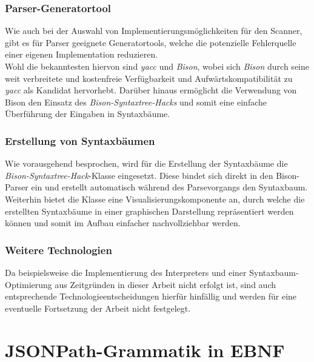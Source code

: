 \documentclass[oneside]{ausarbeitung}
\begin{document}
\pagebreak


\subsubsection{Parser-Generatortool}

Wie auch bei der Auswahl von Implementierungsmöglichkeiten für den Scanner, gibt es für Parser geeignete Generatortools, welche die potenzielle Fehlerquelle einer eigenen Implementation reduzieren. \\
Wohl die bekanntesten hiervon sind \textit{yacc} und \textit{Bison}, wobei sich \textit{Bison} durch seine weit verbreitete und kostenfreie Verfügbarkeit und Aufwärtskompatibilität zu \textit{yacc} als Kandidat hervorhebt. Darüber hinaus ermöglicht die Verwendung von Bison den Einsatz des \textit{Bison-Syntaxtree-Hacks} und somit eine einfache Überführung der Eingaben in Syntaxbäume.



\subsubsection{Erstellung von Syntaxbäumen}

Wie vorausgehend besprochen, wird für die Erstellung der Syntaxbäume die \textit{Bison-Syntaxtree-Hack}-Klasse eingesetzt. Diese bindet sich direkt in den Bison-Parser ein und erstellt automatisch während des Parsevorgangs den Syntaxbaum. Weiterhin bietet die Klasse eine Visualisierungskomponente an, durch welche die erstellten Syntaxbäume in einer graphischen Darstellung repräsentiert werden können und somit im Aufbau einfacher nachvollziehbar werden.\cite{Bantel:bisonhack}



\subsubsection{Weitere Technologien}

Da beispielsweise die Implementierung des Interpreters und einer Syntaxbaum-Optimierung aus Zeitgründen in dieser Arbeit nicht erfolgt ist, sind auch entsprechende Technologieentscheidungen hierfür hinfällig und werden für eine eventuelle Fortsetzung der Arbeit nicht festgelegt.



\section{JSONPath-Grammatik in EBNF}
\end{document}
